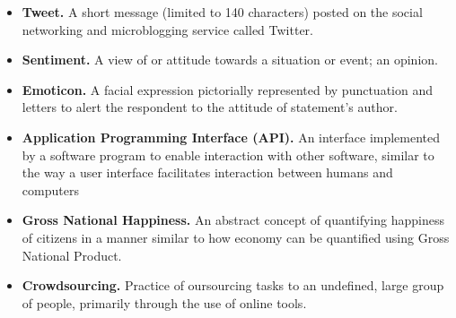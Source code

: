 \begin{itemize}
  \item \textbf{Tweet.} A short message (limited to 140 characters) posted on the social networking and microblogging service called Twitter.
  \item \textbf{Sentiment.} A view of or attitude towards a situation or event; an opinion.
  \item \textbf{Emoticon.} A facial expression pictorially represented by punctuation and letters to alert the respondent to the attitude of statement's author.
  \item \textbf{Application Programming Interface (API).} An interface implemented by a software program to enable interaction with other software, similar to the way a user interface facilitates interaction between humans and computers
  \item \textbf{Gross National Happiness.} An abstract concept of quantifying happiness of citizens in a manner similar to how economy can be quantified using Gross National Product.
  \item \textbf{Crowdsourcing.} Practice of oursourcing tasks to an undefined, large group of people, primarily through the use of online tools.
\end{itemize}